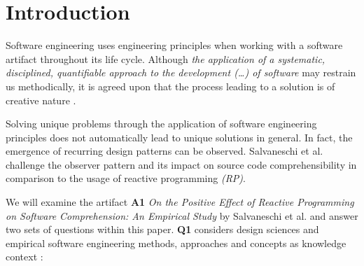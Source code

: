 \documentclass[11pt,a4paper,twocolumn]{article}
\begin{document}

	\section{Introduction}
	Software engineering uses engineering principles when working with a software artifact \cite{159342} throughout its life cycle. Although \emph{the application of a systematic, disciplined, quantifiable approach to the development (\dots) of software} \cite{159342} may restrain us methodically, it is agreed upon that the process leading to a solution is of creative nature \cite{8051350}.

	Solving unique problems through the application of software engineering principles does not automatically lead to unique solutions in general. In fact, the emergence of recurring design patterns can be observed. Salvaneschi et al. \cite{7827078} challenge the observer pattern \cite{gamma1995design} and its impact on source code comprehensibility in comparison to the usage of reactive programming \emph{(RP)}.

	We will examine the artifact \cite{balestra:2019:designscience:articactandcontext} \textbf{A1} \emph{On the Positive Effect of Reactive Programming on Software Comprehension: An Empirical Study} by Salvaneschi et al. \cite{7827078} and answer two sets of questions within this paper. \textbf{Q1} considers design sciences and empirical software engineering methods, approaches and concepts as knowledge context \cite{balestra:2019:designscience:articactandcontext}:
\end{document}
